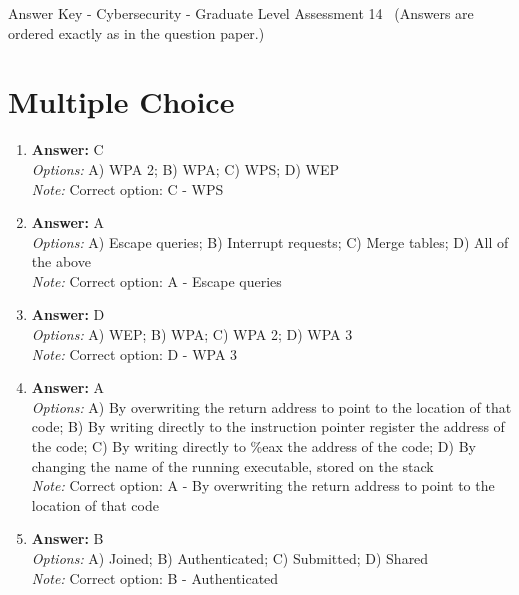 \documentclass[12pt]{article}
\begin{document}
\begin{center}
Answer Key - Cybersecurity - Graduate Level Assessment 14 \
\small (Answers are ordered exactly as in the question paper.)
\end{center}

\section*{Multiple Choice}
\begin{enumerate}[label=\arabic*.]
\item \textbf{Answer:} C
\\ \textit{Options:} A) WPA 2; B) WPA; C) WPS; D) WEP
\\ \textit{Note:} Correct option: C - WPS
\item \textbf{Answer:} A
\\ \textit{Options:} A) Escape queries; B) Interrupt requests; C) Merge tables; D) All of the above
\\ \textit{Note:} Correct option: A - Escape queries
\item \textbf{Answer:} D
\\ \textit{Options:} A) WEP; B) WPA; C) WPA 2; D) WPA 3
\\ \textit{Note:} Correct option: D - WPA 3
\item \textbf{Answer:} A
\\ \textit{Options:} A) By overwriting the return address to point to the location of that code; B) By writing directly to the instruction pointer register the address of the code; C) By writing directly to \%eax the address of the code; D) By changing the name of the running executable, stored on the stack
\\ \textit{Note:} Correct option: A - By overwriting the return address to point to the location of that code
\item \textbf{Answer:} B
\\ \textit{Options:} A) Joined; B) Authenticated; C) Submitted; D) Shared
\\ \textit{Note:} Correct option: B - Authenticated
\end{enumerate}
\end{document}
